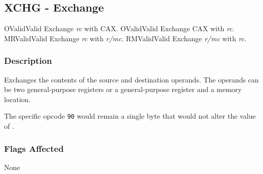 \clearpage
{}
{}
\subsection*{XCHG - Exchange}

\begin{x86opcodetable}
  {O}{Valid}{Valid}
  {Exchange \emph{rc} with CAX.}
  {O}{Valid}{Valid}
  {Exchange CAX with \emph{rc}.}
  {MR}{Valid}{Valid}
  {Exchange \emph{rc} with \emph{r/mc}.}
  {RM}{Valid}{Valid}
  {Exchange \emph{r/mc} with \emph{rc}.}
\end{x86opcodetable}

\begin{x86opentable}
\end{x86opentable}

\subsubsection*{Description}

Exchanges the contents of the source and destination operands.  The
operands can be two general-purpose registers or a general-purpose
register and a memory location.

The specific opcode \texttt{90} would remain a single byte
 that would not alter the value of \CAX{}.

\subsubsection*{Flags Affected}

None
